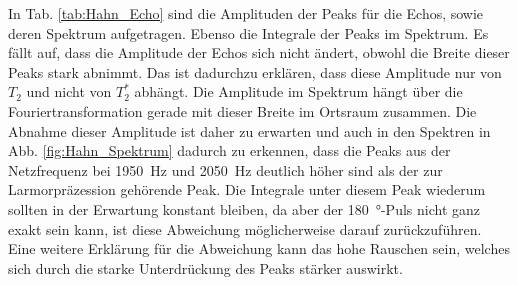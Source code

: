\documentclass[../main.tex]{subfiles}
\begin{document}
    In Tab. \ref{tab:Hahn_Echo} sind die Amplituden der Peaks für die Echos, sowie deren Spektrum aufgetragen. Ebenso die Integrale der Peaks im Spektrum. Es fällt auf, dass die Amplitude der Echos sich nicht ändert, obwohl die Breite dieser Peaks stark abnimmt. Das ist dadurchzu erklären, dass diese Amplitude nur von $T_{2}$ und nicht von $T_{2}^{*}$ abhängt. Die Amplitude im Spektrum hängt über die Fouriertransformation gerade mit dieser Breite im Ortsraum zusammen. Die Abnahme dieser Amplitude ist daher zu erwarten und auch in den Spektren in Abb. \ref{fig:Hahn_Spektrum} dadurch zu erkennen, dass die Peaks aus der Netzfrequenz bei \SI{1950}{\hertz} und \SI{2050}{\hertz} deutlich höher sind als der zur Larmorpräzession gehörende Peak. Die Integrale unter diesem Peak wiederum sollten in der Erwartung konstant bleiben, da aber der \SI{180}{\degree}-Puls nicht ganz exakt sein kann, ist diese Abweichung möglicherweise darauf zurückzuführen. Eine weitere Erklärung für die Abweichung kann das hohe Rauschen sein, welches sich durch die starke Unterdrückung des Peaks stärker auswirkt.
    
    
\end{document}
